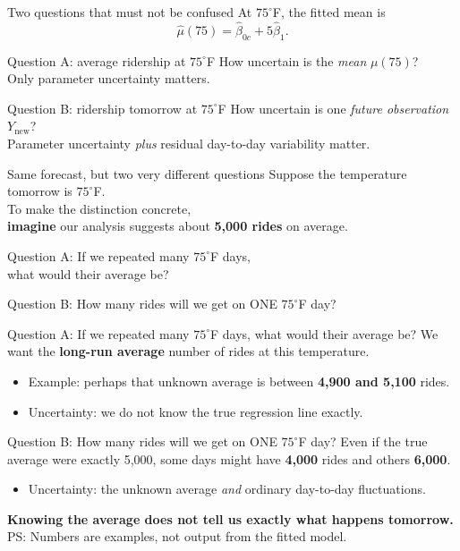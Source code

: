 \documentclass[aspectratio=43,11pt]{beamer}
\begin{document}
{
\begin{frame}{Two questions that must not be confused}
At $75^\circ$F, the fitted mean is
\[\widehat\mu(75)=\widehat\beta_{0c}+5\widehat\beta_1.\]
\begin{block}{Question A: average ridership at $75^\circ$F}
How uncertain is the \emph{mean} $\mu(75)$?\\
Only parameter uncertainty matters.
\end{block}
\begin{block}{Question B: ridership tomorrow at $75^\circ$F}
How uncertain is one \emph{future observation} $Y_{\mathrm{new}}$?\\
Parameter uncertainty \emph{plus} residual day-to-day variability matter.
\end{block}
\end{frame}
}

\begin{frame}{Same forecast, but two very different questions}
\small
Suppose the temperature tomorrow is $75^\circ$F.\\
\vspace{2ex}
To make the distinction concrete,\\
\textbf{imagine} our analysis suggests about \textbf{5,000 rides} on average.
\vspace{2ex}
\begin{block}{Question A: If we repeated many $75^\circ$F days,\\what would their average be?}
\end{block}
\begin{block}{Question B: How many rides will we get on ONE $75^\circ$F day?}
\end{block}
\end{frame}

\begin{frame}{}
\small
\begin{block}{Question A: If we repeated many $75^\circ$F days, what would their average be?}
We want the \textbf{long-run average} number of rides at this temperature.
\begin{itemize}
\item Example: perhaps that unknown average is between \textbf{4,900 and 5,100} rides.
\item Uncertainty: we do not know the true regression line exactly.
\end{itemize}
\end{block}
\begin{block}{Question B: How many rides will we get on ONE $75^\circ$F day?}
Even if the true average were exactly 5,000, some days might have
\textbf{4,000} rides and others \textbf{6,000}.
\begin{itemize}
\item Uncertainty: the unknown average \emph{and} ordinary day-to-day fluctuations.
\end{itemize}
\end{block}
\textbf{Knowing the average does not tell us exactly what happens tomorrow.}\\[1pt]
{\scriptsize PS: Numbers are examples, not output from the fitted model.}
\end{frame}
\end{document}
